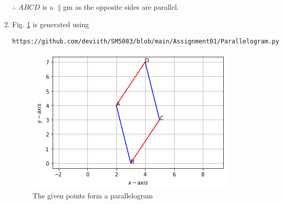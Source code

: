\documentclass[journal,12pt,twocolumn]{IEEEtran}
\renewcommand\thesection{\arabic{section}}
\begin{document}
\begin{enumerate}[label=\thesection.\arabic*.,ref=\thesection.\theenumi]
$\therefore$ $ABCD$ is a $\parallel$gm as the opposite sides are parallel.
%
\item Fig. \ref{fig:3.5.4_quadrilateral1} is generated using 
\begin{lstlisting}
https://github.com/deviith/SM5083/blob/main/Assignment01/Parallelogram.py
\end{lstlisting}
\begin{figure}[!ht]
	\centering
	\includegraphics[width=\columnwidth]{Parallelogram.png}
	\caption{The given points form a parallelogram}
	\label{fig:3.5.4_quadrilateral1}
\end{figure}


\end{enumerate}
\end{document}
